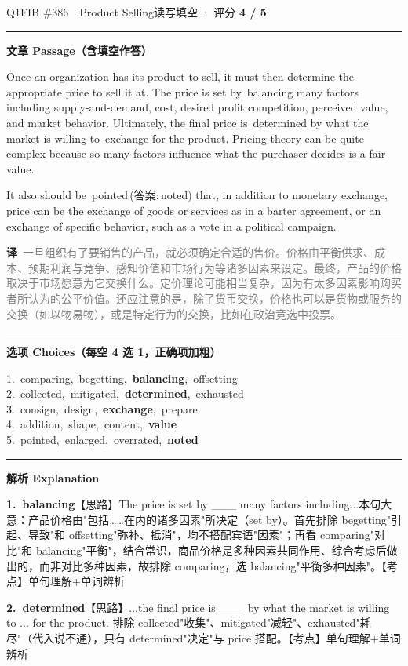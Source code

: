 \documentclass[11pt]{article}
\newcommand{\ptesub}[1]{%
  \par\needspace{2\baselineskip}\smallskip
  {\color{cAccent}\rule[-0.2ex]{3pt}{1.05em}}\hspace{6pt}%
  {\bfseries\color{cHead}#1}\par\nopagebreak\smallskip}
\newcommand{\zh}[1]{{\footnotesize\textcolor{cNote}{\textbf{译}}\ \textcolor{gray}{#1}}}
\newcommand{\rok}[1]{{\color{cFix}\ding{51}\,#1}}                 %
\newcommand{\rno}[2]{{\color{cWrong}\ding{55}\,\sout{#1}}\,{\footnotesize\color{cFix}(答案:\,#2)}}  %
\begin{document}
\begin{qblock}{Q1\quad FIB \#386\ \ Product Selling}{读写填空 · 评分 \textcolor{cAccent}{\bfseries 4 / 5}}
\ptesub{文章 Passage（含填空作答）}
\begin{promptbox}
Once an organization has its product to sell, it must then determine the appropriate price to sell it at. The price is set by \rok{balancing} many factors including supply-and-demand, cost, desired profit competition, perceived value, and market behavior. Ultimately, the final price is \rok{determined} by what the market is willing to \rok{exchange} for the product. Pricing theory can be quite complex because so many factors influence what the purchaser decides is a fair \rok{value}.

It also should be \rno{pointed}{noted} that, in addition to monetary exchange, price can be the exchange of goods or services as in a barter agreement, or an exchange of specific behavior, such as a vote in a political campaign.
\end{promptbox}
\zh{一旦组织有了要销售的产品，就必须确定合适的售价。价格由平衡供求、成本、预期利润与竞争、感知价值和市场行为等诸多因素来设定。最终，产品的价格取决于市场愿意为它交换什么。定价理论可能相当复杂，因为有太多因素影响购买者所认为的公平价值。还应注意的是，除了货币交换，价格也可以是货物或服务的交换（如以物易物），或是特定行为的交换，比如在政治竞选中投票。}
\ptesub{选项 Choices（每空 4 选 1，正确项加粗）}
{\small
1.\ comparing,\ begetting,\ \textbf{balancing},\ offsetting\\
2.\ collected,\ mitigated,\ \textbf{determined},\ exhausted\\
3.\ consign,\ design,\ \textbf{exchange},\ prepare\\
4.\ addition,\ shape,\ content,\ \textbf{value}\\
5.\ pointed,\ enlarged,\ overrated,\ \textbf{noted}}
\ptesub{解析 Explanation}
\begin{notebox}\footnotesize
\textbf{1.\ balancing}\quad【思路】The price is set by \_\_\_ many factors including...本句大意：产品价格由"包括……在内的诸多因素"所决定（set by）。首先排除 begetting"引起、导致"和 offsetting"弥补、抵消"，均不搭配宾语"因素"；再看 comparing"对比"和 balancing"平衡"，结合常识，商品价格是多种因素共同作用、综合考虑后做出的，而非对比多种因素，故排除 comparing，选 balancing"平衡多种因素"。【考点】单句理解+单词辨析\par\smallskip
\textbf{2.\ determined}\quad【思路】...the final price is \_\_\_ by what the market is willing to ... for the product. 排除 collected"收集"、mitigated"减轻"、exhausted"耗尽"（代入说不通），只有 determined"决定"与 price 搭配。【考点】单句理解+单词辨析\par\smallskip

\end{notebox}
\end{qblock}
\end{document}
